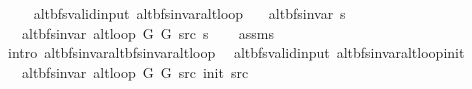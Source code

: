 \begin{isabellebody}
\ \ \isamarkupfalse%
\isanewline
{}\isamarkupfalse%
%
\endisatagproof
{\isafoldproof}%
%
\isadelimproof
\isanewline
%
\endisadelimproof
%
\isadeliminvisible
\isanewline
%
\endisadeliminvisible
%
\isataginvisible
{}\isamarkupfalse%
\ {\isacharparenleft}{\kern0pt}\ alt{\isacharunderscore}{\kern0pt}bfs{\isacharunderscore}{\kern0pt}valid{\isacharunderscore}{\kern0pt}input{\isacharparenright}{\kern0pt}\ alt{\isacharunderscore}{\kern0pt}bfs{\isacharunderscore}{\kern0pt}invar{\isacharunderscore}{\kern0pt}alt{\isacharunderscore}{\kern0pt}loop{\isacharcolon}{\kern0pt}\isanewline
\ \ \ {\isachardoublequoteopen}alt{\isacharunderscore}{\kern0pt}bfs{\isacharunderscore}{\kern0pt}invar{\isacharprime}{\kern0pt}{\isacharprime}{\kern0pt}\ s{\isachardoublequoteclose}\isanewline
\ \ \ {\isachardoublequoteopen}alt{\isacharunderscore}{\kern0pt}bfs{\isacharunderscore}{\kern0pt}invar{\isacharprime}{\kern0pt}{\isacharprime}{\kern0pt}\ {\isacharparenleft}{\kern0pt}alt{\isacharunderscore}{\kern0pt}loop\ G{}\ G{}\ src\ s{\isacharparenright}{\kern0pt}{\isachardoublequoteclose}%
\endisataginvisible
{\isafoldinvisible}%
%
\isadeliminvisible
\isanewline
%
\endisadeliminvisible
%
\isadelimproof
\ \ %
\endisadelimproof
%
\isatagproof
{}\isamarkupfalse%
\ assms\isanewline
\ \ \isamarkupfalse%
\ {\isacharparenleft}{\kern0pt}intro\ alt{\isacharunderscore}{\kern0pt}bfs{\isacharunderscore}{\kern0pt}invar{\isachardot}{\kern0pt}alt{\isacharunderscore}{\kern0pt}bfs{\isacharunderscore}{\kern0pt}invar{\isacharunderscore}{\kern0pt}alt{\isacharunderscore}{\kern0pt}loop{\isacharparenright}{\kern0pt}%
\endisatagproof
{\isafoldproof}%
%
\isadelimproof
\isanewline
%
\endisadelimproof
%
\isadeliminvisible
\isanewline
%
\endisadeliminvisible
%
\isataginvisible
{}\isamarkupfalse%
\ {\isacharparenleft}{\kern0pt}\ alt{\isacharunderscore}{\kern0pt}bfs{\isacharunderscore}{\kern0pt}valid{\isacharunderscore}{\kern0pt}input{\isacharparenright}{\kern0pt}\ alt{\isacharunderscore}{\kern0pt}bfs{\isacharunderscore}{\kern0pt}invar{\isacharunderscore}{\kern0pt}alt{\isacharunderscore}{\kern0pt}loop{\isacharunderscore}{\kern0pt}init{\isacharcolon}{\kern0pt}\isanewline
\ \ \ {\isachardoublequoteopen}alt{\isacharunderscore}{\kern0pt}bfs{\isacharunderscore}{\kern0pt}invar{\isacharprime}{\kern0pt}{\isacharprime}{\kern0pt}\ {\isacharparenleft}{\kern0pt}alt{\isacharunderscore}{\kern0pt}loop\ G{}\ G{}\ src\ {\isacharparenleft}{\kern0pt}init\ src{\isacharparenright}{\kern0pt}{\isacharparenright}{\kern0pt}{\isachardoublequoteclose}%

\end{isabellebody}
